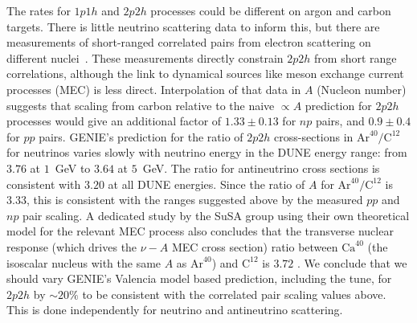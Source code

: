 
The rates for $1p1h$ and $2p2h$ processes could be different on argon and carbon targets.  There is little neutrino scattering data to inform this, but there are measurements of short-ranged correlated pairs from electron scattering on different nuclei~\cite{Colle:2015ena}.  These measurements directly constrain $2p2h$ from short range correlations, although the link to dynamical sources like meson exchange current processes (MEC) is less direct. Interpolation of that data in $A$ (Nucleon number) suggests that scaling from carbon relative to the naive $\propto A$ prediction for $2p2h$ processes would give an additional factor of $1.33\pm 0.13$ for $np$ pairs, and $0.9\pm 0.4$ for $pp$ pairs.
GENIE's prediction for the ratio of $2p2h$ cross-sections in $\text{Ar}^{40}/\text{C}^{12}$ for neutrinos varies slowly with neutrino energy in the DUNE energy range: from $3.76$ at $1$~GeV to $3.64$ at $5$~GeV. The ratio for antineutrino cross sections is consistent with $3.20$ at all DUNE energies. Since the ratio of $A$ for $\text{Ar}^{40}/\text{C}^{12}$ is $3.33$, this is consistent with the ranges suggested above by the measured $pp$ and $np$ pair scaling.  A dedicated study by the SuSA group using their own theoretical model for the relevant MEC process also concludes that the transverse nuclear response (which drives the $\nu-A$ MEC cross section) ratio between $\text{Ca}^{40}$ (the isoscalar nucleus with the same $A$ as $\text{Ar}^{40}$) and $\text{C}^{12}$ is $3.72$ \cite{Amaro:2017eah}. We conclude that we should vary GENIE's Valencia model based prediction, including the \minerva tune, for $2p2h$ by $\sim 20\%$ to be consistent with the correlated pair scaling values above. This is done independently for neutrino and antineutrino scattering.

